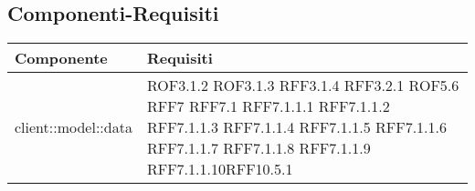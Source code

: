 \subsection{Componenti-Requisiti} %
\label{sub:componenti_requisiti}
\begin{center}
\def\arraystretch{1.5}
\bgroup
\begin{longtable}{| p{9cm} | p{4cm} |}
\hline
\textbf{Componente} & \textbf{Requisiti} \\
\hline
client::model::data  &  ROF3.1.2 \newline ROF3.1.3 \newline RFF3.1.4 \newline RFF3.2.1 \newline ROF5.6 \newline RFF7 \newline RFF7.1 \newline RFF7.1.1.1 \newline RFF7.1.1.2 \newline RFF7.1.1.3 \newline RFF7.1.1.4 \newline RFF7.1.1.5 \newline RFF7.1.1.6 \newline RFF7.1.1.7 \newline RFF7.1.1.8 \newline RFF7.1.1.9 \newline RFF7.1.1.10\newline RFF10.5.1 \newline\\
\hline

\end{longtable}
\end{center}
